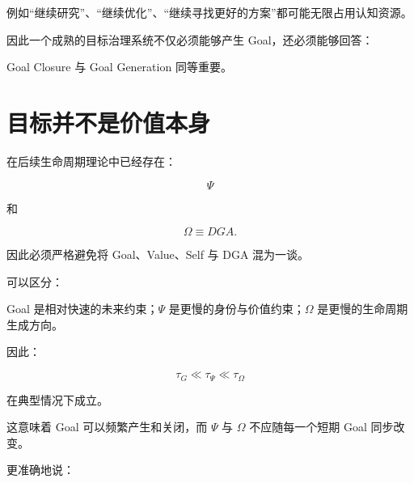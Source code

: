 例如``继续研究''、``继续优化''、``继续寻找更好的方案''都可能无限占用认知资源。

因此一个成熟的目标治理系统不仅必须能够产生 Goal，还必须能够回答：

\begin{statementbox}
\centering
{}
\end{statementbox}

Goal Closure 与 Goal Generation 同等重要。


\section{目标并不是价值本身}

在后续生命周期理论中已经存在：

\[
\Psi
\]

和

\[
\Omega\equiv DGA.
\]

因此必须严格避免将 Goal、Value、Self 与 DGA 混为一谈。

可以区分：

\begin{statementbox}
\centering
{}
\end{statementbox}

\begin{statementbox}
\centering
{}
\end{statementbox}

\begin{statementbox}
\centering
{}
\end{statementbox}

Goal 是相对快速的未来约束；$\Psi$ 是更慢的身份与价值约束；$\Omega$ 是更慢的生命周期生成方向。

因此：

\[
\tau_G
\ll
\tau_\Psi
\ll
\tau_\Omega
\]

在典型情况下成立。

这意味着 Goal 可以频繁产生和关闭，而 $\Psi$ 与 $\Omega$ 不应随每一个短期 Goal 同步改变。

更准确地说：

\begin{statementbox}
\centering
{}
\end{statementbox}

